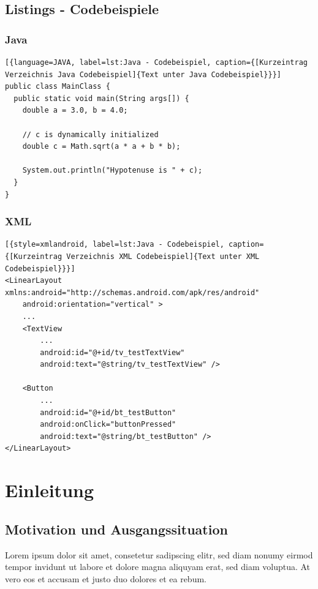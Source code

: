 \documentclass[
							a4paper, 
							11pt, 
							openany, 
							liststotoc,
							parskip=half, 
   							headings=normal
						]{scrreprt}
\begin{document}
\section{Listings - Codebeispiele} \label{se:konstrukte_listings}
\subsection{Java}
\begin{lstlisting}[{language=JAVA, label=lst:Java - Codebeispiel, caption={[Kurzeintrag Verzeichnis Java Codebeispiel]{Text unter Java Codebeispiel}}}]
public class MainClass {
  public static void main(String args[]) {
    double a = 3.0, b = 4.0;

    // c is dynamically initialized
    double c = Math.sqrt(a * a + b * b);

    System.out.println("Hypotenuse is " + c);
  }
}
\end{lstlisting}
\clearpage

\subsection{XML}
\begin{lstlisting}[{style=xmlandroid, label=lst:Java - Codebeispiel, caption={[Kurzeintrag Verzeichnis XML Codebeispiel]{Text unter XML Codebeispiel}}}]
<LinearLayout xmlns:android="http://schemas.android.com/apk/res/android"
	android:orientation="vertical" >
	...
	<TextView
		...
		android:id="@+id/tv_testTextView"
		android:text="@string/tv_testTextView" />

	<Button
		...
		android:id="@+id/bt_testButton"
		android:onClick="buttonPressed"
		android:text="@string/bt_testButton" />        
</LinearLayout>
\end{lstlisting}
\clearpage

	
\chapter{Einleitung} \label{ch:einleitung}

\section{Motivation und Ausgangssituation} \label{se:einleitung_motivation}
Lorem ipsum dolor sit amet, consetetur sadipscing elitr, sed diam nonumy eirmod tempor invidunt ut labore et dolore magna aliquyam erat, sed diam voluptua. At vero eos et accusam et justo duo dolores et ea rebum.
\clearpage
\end{document}
